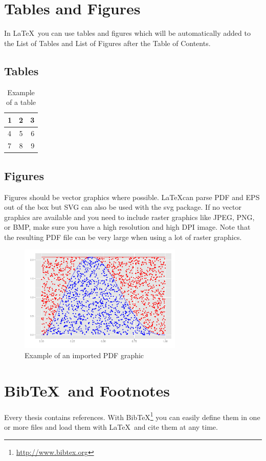 \documentclass[masterarbeit,grey, english]{mas-thesis-sections}	%
\begin{document}
\newpage


\section{Tables and Figures}

In \LaTeX\ you can use tables and figures which will be automatically added to the List of Tables and List of Figures after the Table of Contents.

\subsection{Tables}

\begin{table}[ht]
\begin{center}
	\begin{tabular}{ l | c | r }
		1 & 2 & 3 \\
		\hline
		4 & 5 & 6 \\
		7 & 8 & 9 \\
	\end{tabular}
	\caption{Example of a table}
	\label{table:1}
\end{center}
\end{table}

\subsection{Figures}

Figures should be vector graphics where possible. \LaTeX can parse PDF and EPS out of the box but SVG can also be used with the svg package. If no vector graphics are available and you need to include raster graphics like JPEG, PNG, or BMP, make sure you have a high resolution and high DPI image. Note that the resulting PDF file can be very large when using a lot of raster graphics.

\begin{figure}[ht]
	\centering
	\includegraphics[height=5.1cm]{graphics/demo-graphic.pdf}
	\caption{Example of an imported PDF graphic}
	\label{figure:1}
\end{figure}

\newpage

\section{Bib\TeX\ and Footnotes}

Every thesis contains references. With Bib\TeX\footnote{\url{http://www.bibtex.org}} you can easily define them in one or more files and load them with \LaTeX\ and cite them at any time.\cite{exampleBook}
\cleardoublepage

\printbibliography[heading=bibintoc]
\end{document}
